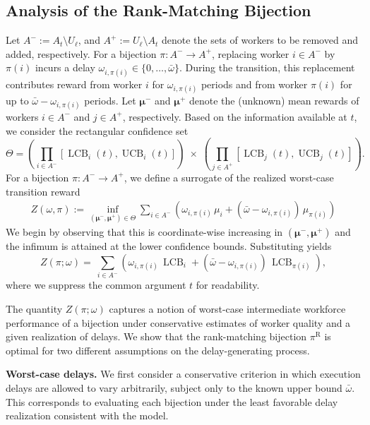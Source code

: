 \documentclass[opre,blindrev]{informs3}
\newcommand{\UCB}{\operatorname{UCB}}
\newcommand{\LCB}{\operatorname{LCB}}
\begin{document}
\begin{APPENDICES}
\section{Analysis of the Rank-Matching Bijection} \label{sec:bijection_analysis}
Let \(A^- := A_t \setminus U_\ell\), and \(A^+ := U_\ell \setminus A_t\) denote the sets of workers to be removed and added, respectively. For a bijection \(\pi : A^- \to A^+\), replacing worker \(i \in A^-\) by \(\pi(i)\) incurs a delay \(\omega_{i,\pi(i)} \in \{0,\dots,\bar{\omega}\}\). During the transition, this replacement contributes reward from worker \(i\) for \(\omega_{i,\pi(i)}\) periods and from worker \(\pi(i)\) for up to \(\bar{\omega}-\omega_{i,\pi(i)}\) periods. Let \(\boldsymbol{\mu}^-\) and \(\boldsymbol{\mu}^+\) denote the (unknown) mean rewards of workers \(i \in A^{-}\) and \(j \in A^{+}\), respectively. Based on the information available at \(t\), we consider the rectangular confidence set
\[
    \Theta=\left(\prod_{i\in A^{-}} [\LCB_i(t), \UCB_i(t)]\right)
    \;\times\;\left(\prod_{j\in A^{+}} [\LCB_j(t), \UCB_j(t)]\right).
\]
For a bijection \(\pi:A^- \to A^+\), we define a surrogate of the realized worst-case transition reward
\begin{align*}
    Z(\omega, \pi):=
    \inf_{(\boldsymbol{\mu}^-,\boldsymbol{\mu}^+)\in\Theta}\sum_{i\in A^-}\left(\omega_{i,\pi(i)}\,\mu_i+(\bar{\omega}-\omega_{i,\pi(i)})\,\mu_{\pi(i)}\right)
\end{align*}
We begin by observing that this is coordinate-wise increasing in \((\boldsymbol{\mu}^-,\boldsymbol{\mu}^+)\) and the infimum is attained at the lower confidence bounds. Substituting yields
\[Z(\pi;\omega )=
    ~\sum_{i\in A^-}\left(\omega_{i,\pi(i)}\,\LCB_i+(\bar{\omega}-\omega_{i,\pi(i)})\,\LCB_{\pi(i)}\right),\]
where we suppress the common argument \(t\) for readability. 

The quantity \(Z(\pi;\omega)\) captures a notion of worst-case intermediate workforce performance of a bijection under conservative estimates of worker quality and a given realization of delays. We show that the rank-matching bijection \(\pi^{\mathrm{R}}\) is optimal for two different assumptions on the delay-generating process.

{\bf Worst-case delays.}
We first consider a conservative criterion in which execution delays are allowed to vary arbitrarily, subject only to the known upper bound \(\bar{\omega}\). This corresponds to evaluating each bijection under the least favorable delay realization consistent with the model.


\end{APPENDICES}
\end{document}
